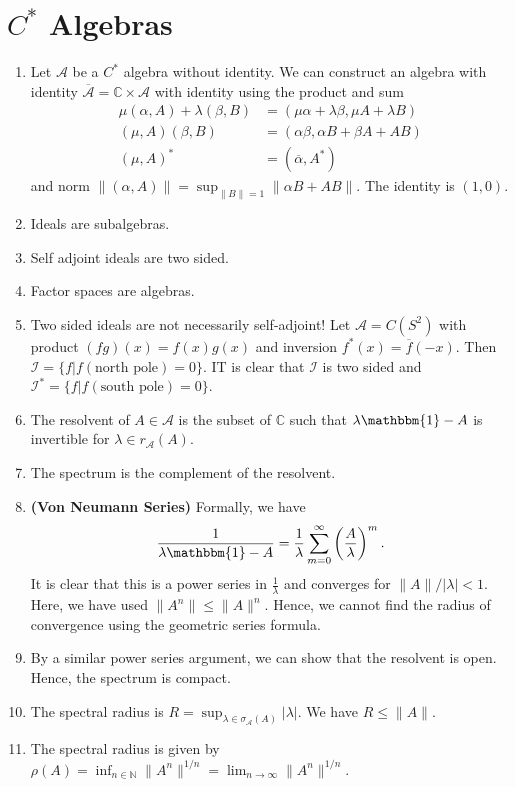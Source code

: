 \documentclass[twoside,symmetric, openany, 12pt]{./tuftebook}
\theoremstyle{definition}
\theoremstyle{definition}
\theoremstyle{definition}
\newcommand{\N}{\mathbb{N}}
\begin{document}
\section{$C^*$ Algebras}
\begin{enumerate}
	\item Let $\mathcal{A}$ be a $C^* $ algebra without identity. We can construct an algebra with identity $\overline{\mathcal{A}}=\mathbb{C}\times \mathcal{A}$ with identity using the product and sum
		\begin{align*}
			\mu(\alpha, A) + \lambda(\beta, B) &= (\mu \alpha + \lambda\beta, \mu A + \lambda B) \\
			(\mu, A)(\beta, B) &= (\alpha\beta, \alpha B + \beta A + AB) \\
			(\mu, A)^* &= (\overline{\alpha}, A^*) 
		\end{align*}
		and norm $\|(\alpha, A)\|= \sup_{\|B\|=1} \|\alpha B + AB\|$. The identity is $(1,0)$.
	\item Ideals are subalgebras.
	\item Self adjoint ideals are two sided.
	\item Factor spaces are algebras.
	\item Two sided ideals are not necessarily self-adjoint! Let $\mathcal{A}=C(S^2)$ with product $(fg)(x)= f(x)g(x)$ and inversion $f^*(x) = \overline{f}(-x)$. Then $\mathcal{I}=\{f|f(\text{north pole})=0\} $. IT is clear that $\mathcal{I}$ is two sided and $\mathcal{I}^* = \{f|f(\text{south pole}) = 0\} $.
	\item The resolvent of $A\in \mathcal{A}$ is the subset of $\mathbb{C}$ such that $\lambda\mathbbm{1} -  A$ is invertible for $\lambda\in r_{\mathcal{A}}(A)$. 
	\item The spectrum is the complement of the resolvent.
	\item \textbf{(Von Neumann Series)} Formally, we have
		\[
			\frac{1}{\lambda \mathbbm{1} - A}= \frac{1}{\lambda}\sum_{m=0}^{\infty} \left( \frac{A}{\lambda} \right)^m
		.\] 
		It is clear that this is a power series in $\frac{1}{\lambda}$ and converges for $\|A\| / |\lambda| < 1$. Here, we have used $\|A^n\|\le \|A\|^n$. Hence, we cannot find the radius of convergence using the geometric series formula.
	\item By a similar power series argument, we can show that the resolvent is open. Hence, the spectrum is compact.
	\item The spectral radius is $R = \sup_{\lambda\in \sigma_{\mathcal{A}}(A)}|\lambda|$. We have $R \le \|A\|$. 
	\item The spectral radius is given by $\rho(A) = \inf_{n\in \N}\|A^n\|^{1 / n}=\lim_{n \to \infty} \|A^n\|^{1 / n}$. 


\end{enumerate}
\end{document}
